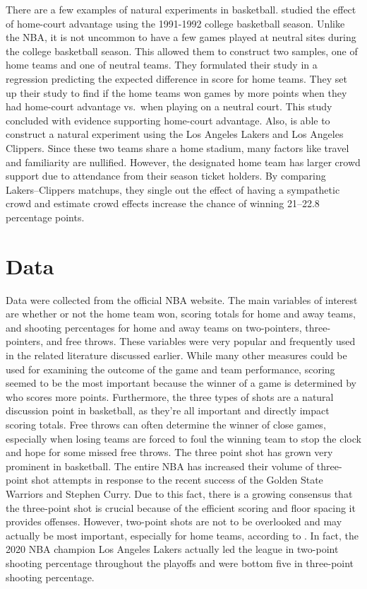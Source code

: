 \documentclass[10pt]{article}
\begin{document}
There are a few examples of natural experiments in basketball. \citet{Harville} studied the
effect of home-court advantage using the 1991-1992 college basketball season.
Unlike the NBA, it is not uncommon to have a few games played at neutral sites
during the college basketball season. This allowed them to construct two samples,
one of home teams and one of neutral teams. They formulated their study in a
regression predicting the expected difference in score for home teams.
They set up their study to find if the home teams won games by more points when
they had home-court advantage vs.~when playing on a neutral court. This study
concluded with evidence supporting home-court advantage. Also, \citet{Boudreaux} 
is able to construct a natural experiment using the Los Angeles Lakers and 
Los Angeles Clippers. Since these two teams share a home stadium, many factors like travel 
and familiarity are nullified. However, the designated home team has larger crowd
support due to attendance from their season ticket holders. By comparing
Lakers--Clippers matchups, they single out the effect of having a sympathetic
crowd and \citet{Boudreaux} estimate crowd effects increase the chance
of winning 21--22.8 percentage points.



\section{Data}

Data were collected from the official NBA website. The main variables of interest
are whether or not the home team won, scoring totals for home and away teams, and
shooting percentages for home and away teams on two-pointers, three-pointers, and
free throws. These variables were very popular and frequently used in the related
literature discussed earlier. While many other measures could be used for examining
the outcome of the game and team performance, scoring seemed to be the most
important because the winner of a game is determined by who scores more points. Furthermore, 
the three types of shots are a
natural discussion point in basketball, as they're all
important and directly impact scoring totals. Free throws can often determine the winner of close
games, especially when losing teams are forced to foul the winning team to
stop the clock and hope for some missed free throws. The three
point shot has grown very prominent in basketball. The entire NBA has increased their
volume of three-point shot attempts in response to the
recent success of the Golden State Warriors and Stephen Curry. Due to this
fact, there is a growing consensus that the three-point shot is crucial because of 
the efficient scoring and floor spacing it provides offenses. 
However, two-point shots are not to be overlooked and may
actually be most important, especially for home teams, according
to \citet{Harris}. In fact, the 2020 NBA champion Los Angeles Lakers actually led the 
league in two-point shooting percentage throughout the playoffs and were bottom five
in three-point shooting percentage.
\end{document}

